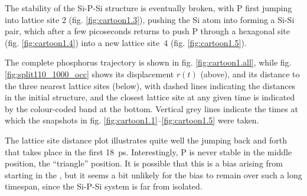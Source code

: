 \documentclass[11pt,bibliography=totoc,index=totoc]{scrbook}   %
\begin{document}
The stability of the Si-P-Si structure is eventually broken, with P first jumping into lattice site 2 (fig. \ref{fig:cartoon1.3}), 
pushing the Si atom into forming a Si-Si pair, which after a few picoseconds returns to push P
through a hexagonal site (fig. \ref{fig:cartoon1.4}) into a new lattice site~4 (fig. \ref{fig:cartoon1.5}).

The complete phosphorus trajectory is shown in fig. \ref{fig:cartoon1.all},
while fig. \ref{fig:split110_1000_occ} shows its displacement $r(t)$ (above),
and its distance to the three nearest lattice sites (below),
with dashed lines indicating the distances in the initial structure,
and the closest lattice site at any given time is indicated by the colour-coded band at the bottom.
Vertical grey lines indicate the times at which the snapshots 
in fig. \ref{fig:cartoon1.1}--\ref{fig:cartoon1.5} were taken.

The lattice site distance plot illustrates quite well the jumping back and forth that takes place in the first 18~ps.
Interestingly, P is never stable in the middle position, the ``triangle'' position.
It is possible that this is a bias arising from starting in the , 
but it seems a bit unlikely for the bias to remain over such a long timespan, 
since the Si-P-Si system is far from isolated.






\end{document}
